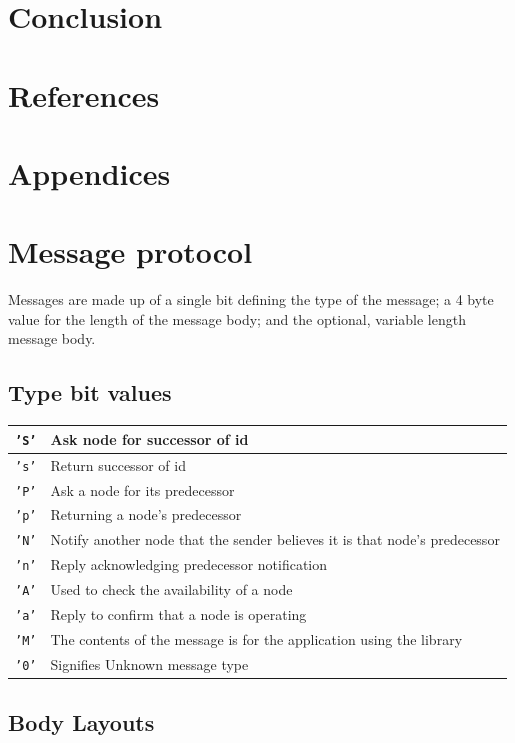 \documentclass{article}
\begin{document}

\section{Conclusion}



\section{References}

%
%

\printbibliography


\section{Appendices}
\appendix
\section{Message protocol}

Messages are made up of a single bit defining the type of the message; a 4 byte value for the length of the message body; and the optional, variable length message body.

\subsection{Type bit values}
\begin{tabular}{|l | l|}
\hline
\texttt{'S'} & Ask node for successor of id \\\hline
\texttt{'s'} & Return successor of id \\\hline
\texttt{'P'} & Ask a node for its predecessor \\\hline
\texttt{'p'} & Returning a node's predecessor \\\hline
\texttt{'N'} & Notify another node that the sender believes it is that node's predecessor \\\hline
\texttt{'n'} & Reply acknowledging predecessor notification \\\hline
\texttt{'A'} & Used to check the availability of a node\\\hline
\texttt{'a'} & Reply to confirm that a node is operating \\\hline
\texttt{'M'} & The contents of the message is for the application using the library \\\hline
\texttt{'0'} & Signifies Unknown message type \\\hline
\end{tabular}

\subsection{Body Layouts}
\end{document}
